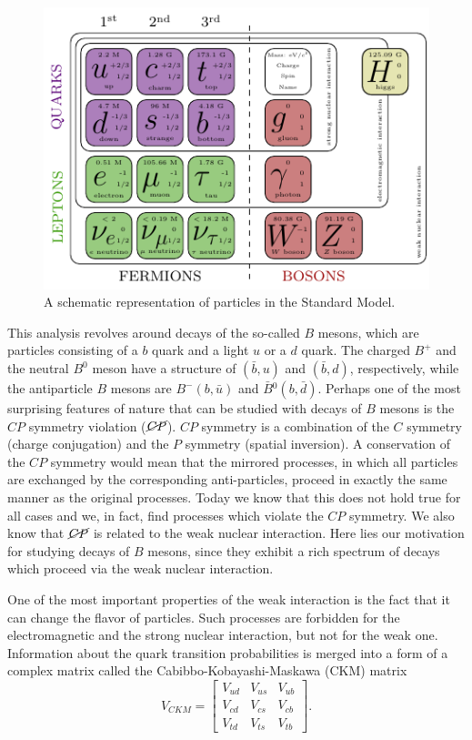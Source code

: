 \begin{figure}[H]
	\centering
	\includegraphics[scale=1.6]{texfig/SM}
	\captionsetup{width=.8\linewidth}
	\caption{A schematic representation of particles in the Standard Model.}
	\label{fig:sm}
\end{figure}

This analysis revolves around decays of the so-called $B$ mesons, which are particles consisting of a $b$ quark and a light $u$ or a $d$ quark. The charged $B^+$ and the neutral $B^0$ meson have a structure of $(\bar b, u)$ and $(\bar b, d)$, respectively, while the antiparticle $B$ mesons are $B^-(b, \bar u)$ and $\bar B{}^0(b, \bar d)$.  Perhaps one of the most surprising features of nature that can be studied with decays of $B$ mesons is the $CP$ symmetry violation ($\cancel{CP}$). $CP$ symmetry is a combination of the $C$ symmetry (charge conjugation) and the $P$ symmetry (spatial inversion). A conservation of the $CP$ symmetry would mean that the mirrored processes, in which all particles are exchanged by the corresponding anti-particles, proceed in exactly the same manner as the original processes. Today we know that this does not hold true for all cases and we, in fact, find processes which violate the $CP$ symmetry. We also know that $\cancel{CP}$ is related to the weak nuclear interaction. Here lies our motivation for studying decays of $B$ mesons, since they exhibit a rich spectrum of decays which proceed via the weak nuclear interaction.

One of the most important properties of the weak interaction is the fact that it can change the flavor of particles. Such processes are forbidden for the electromagnetic and the strong nuclear interaction, but not for the weak one. Information about the quark transition probabilities is merged into a form of a complex matrix called the Cabibbo-Kobayashi-Maskawa (CKM) matrix \cite{cabibbo1963unitary,kobayashi1973cp}
\begin{equation}
V_{CKM} = \begin{bmatrix}
V_{ud} & V_{us} & V_{ub}\\
V_{cd} & V_{cs} & V_{cb}\\
V_{td} & V_{ts} & V_{tb}
\end{bmatrix}.
\end{equation}

